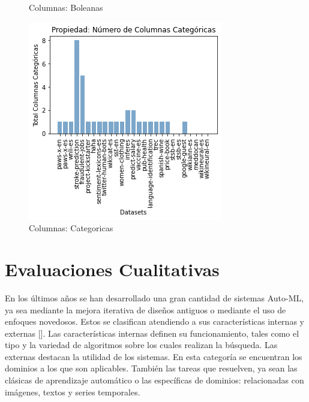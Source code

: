 \begin{figure}
\begin{minipage}[b]{0.31\textwidth}
        \caption{Columnas: Boleanas}
        \label{fig:columns-b}
  \end{minipage}      
\hspace{0.01cm}
    \begin{minipage}[b]{0.31\textwidth}
        \centering
        \includegraphics[width=\textwidth]{Graphics/results/columns_c.png}
          \caption{Columnas: Categoricas}
          \label{fig:columns-c}
        \end{minipage} 
\end{figure}

\section{Evaluaciones Cualitativas}\label{section:qualitative}

En los últimos años se han desarrollado una gran cantidad de sistemas Auto-ML, ya sea mediante la mejora iterativa de diseños antiguos o mediante 
el uso de enfoques novedosos. Estos se clasifican atendiendo a sus características internas y externas [\cite{52}]. Las características internas definen su 
funcionamiento, tales como el tipo y la variedad de algoritmos sobre los cuales realizan la búsqueda. Las externas 
destacan la utilidad de los sistemas. En esta categoría se encuentran los dominios a los que son aplicables. También las tareas que resuelven, ya sean las clásicas de 
aprendizaje automático o las específicas de dominios: relacionadas con imágenes, textos y series temporales. 

